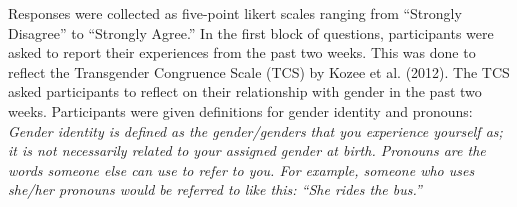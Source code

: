 \documentclass[12pt,twoside]{reedthesis}
\begin{document}
Responses were collected as five-point likert scales ranging from ``Strongly Disagree'' to ``Strongly Agree.'' In the first block of questions, participants were asked to report their experiences from the past two weeks. This was done to reflect the Transgender Congruence Scale (TCS) by Kozee et al. (2012). The TCS asked participants to reflect on their relationship with gender in the past two weeks. Participants were given definitions for gender identity and pronouns: \emph{Gender identity is defined as the gender/genders that you experience yourself as; it is not necessarily related to your assigned gender at birth. Pronouns are the words someone else can use to refer to you. For example, someone who uses she/her pronouns would be referred to like this: ``She rides the bus.''}
\begin{table}


\end{table}
\end{document}
